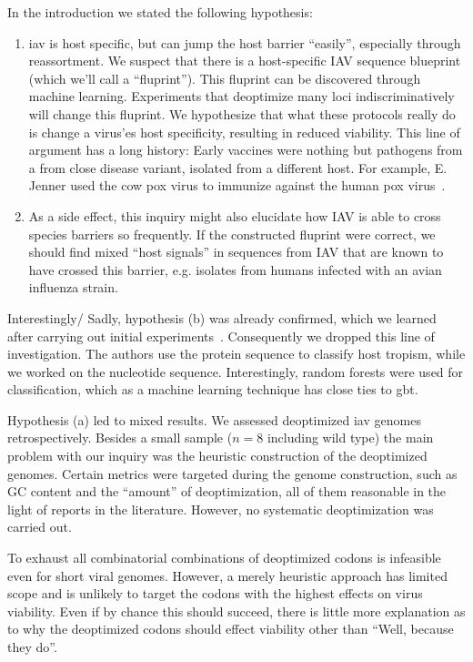 In the introduction we stated the following hypothesis:

\begin{enumerate}[label=(\alph*)]
    \item \gls{iav} is host specific, but can jump the host barrier ``easily'', especially through reassortment. We suspect that there is a host-specific IAV sequence blueprint (which we'll call a ``fluprint''). This fluprint can be discovered through machine learning. Experiments that deoptimize many loci indiscriminatively will change this fluprint. We hypothesize that what these protocols really do is change a virus'es host specificity, resulting in reduced viability. This line of argument has a long history: Early vaccines were nothing but pathogens from a from close disease variant, isolated from a different host. For example, E. Jenner used the cow pox virus to immunize against the human pox virus~\cite{Riedel2005-pt}.
    \item As a side effect, this inquiry might also elucidate how IAV is able to cross species barriers so frequently. If the constructed fluprint were correct, we should find mixed ``host signals'' in sequences from IAV that are known to have crossed this barrier, e.g. isolates from humans infected with an avian influenza strain.
\end{enumerate}


Interestingly/ Sadly, hypothesis (b) was already confirmed, which we learned after carrying out initial experiments~\cite{Eng2014-ar, Eng2016-bg}. Consequently we dropped this line of investigation. The authors use the protein sequence to classify host tropism, while we worked on the nucleotide sequence. Interestingly, random forests were used for classification, which as a machine learning technique has close ties to \gls{gbt}.

Hypothesis (a) led to mixed results. We assessed deoptimized \gls{iav} genomes retrospectively. Besides a small sample ($n = 8$ including wild type) the main problem with our inquiry was the heuristic construction of the deoptimized genomes. Certain metrics were targeted during the genome construction, such as GC content and the ``amount'' of deoptimization, all of them reasonable in the light of reports in the literature. However, no systematic deoptimization was carried out.

To exhaust all combinatorial combinations of deoptimized codons is infeasible even for short viral genomes. However, a merely heuristic approach has limited scope and is unlikely to target the codons with the highest effects on virus viability. Even if by chance this should succeed, there is little more explanation as to why the deoptimized codons should effect viability other than ``Well, because they do''.

